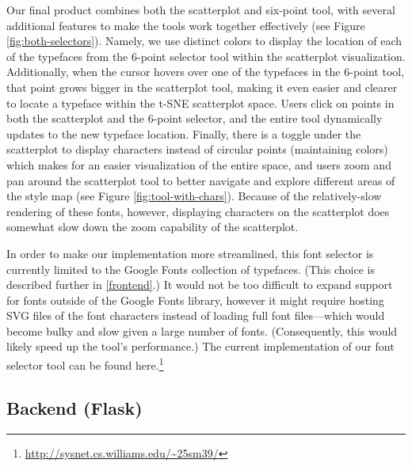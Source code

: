 Our final product combines both the scatterplot and six-point tool, with several additional features to make the tools work together effectively (see Figure \ref{fig:both-selectors}). Namely, we use distinct colors to display the location of each of the typefaces from the 6-point selector tool within the scatterplot visualization. Additionally, when the cursor hovers over one of the typefaces in the 6-point tool, that point grows bigger in the scatterplot tool, making it even easier and clearer to locate a typeface within the t-SNE scatterplot space. Users click on points in both the scatterplot and the 6-point selector, and the entire tool dynamically updates to the new typeface location. Finally, there is a toggle under the scatterplot to display characters instead of circular points (maintaining colors) which makes for an easier visualization of the entire space, and users zoom and pan around the scatterplot tool to better navigate and explore different areas of the style map (see Figure \ref{fig:tool-with-chars}). Because of the relatively-slow rendering of these fonts, however, displaying characters on the scatterplot does somewhat slow down the zoom capability of the scatterplot.

In order to make our implementation more streamlined, this font selector is currently limited to the Google Fonts collection of typefaces. (This choice is described further in \ref{frontend}.) It would not be too difficult to expand support for fonts outside of the Google Fonts library, however it might require hosting SVG files of the font characters instead of loading full font files---which would become bulky and slow given a large number of fonts. (Consequently, this would likely speed up the tool's performance.) The current implementation of our font selector tool can be found here.\footnote{\url{http://sysnet.cs.williams.edu/~25sm39/}}

\subsection{Backend (Flask)}


